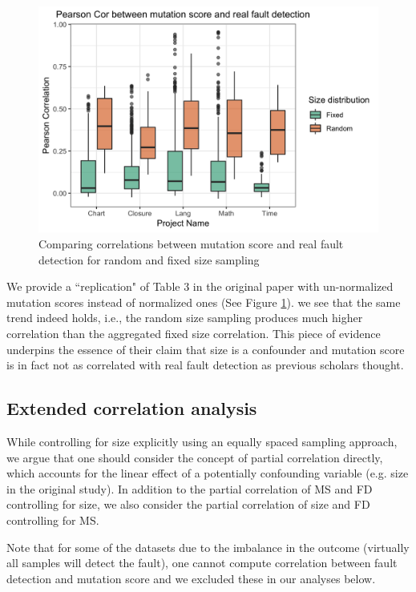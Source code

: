 \documentclass[10pt,letterpaper]{article}
\begin{document}
    \begin{figure}[ht!]
        \centering
        \includegraphics[scale=0.15]{figures/reproduce_fig_3.png}
        \caption{Comparing correlations between mutation score and real fault detection for random and fixed size sampling}
        \label{fig:rep_fig3}
    \end{figure}
    
We provide a ``replication" of Table 3 in the original paper with un-normalized mutation scores instead of normalized ones (See Figure \ref{fig:rep_fig3}). we see that the same trend indeed holds, i.e., the random size sampling produces much higher correlation than the aggregated fixed size correlation. This piece of evidence underpins the essence of their claim that size is a confounder and mutation score is in fact not as correlated with real fault detection as previous scholars thought.



\subsection{Extended correlation analysis}

While controlling for size explicitly using an equally spaced sampling approach, we argue that one should consider the concept of partial correlation directly, which accounts for the linear effect of a potentially confounding variable (e.g. size in the original study). In addition to the partial correlation of MS and FD controlling for size, we also consider the partial correlation of size and FD controlling for MS. 

Note that for some of the datasets due to the imbalance in the outcome (virtually all samples will detect the fault), one cannot compute correlation between fault detection and mutation score and we excluded these in our analyses below.
\end{document}
